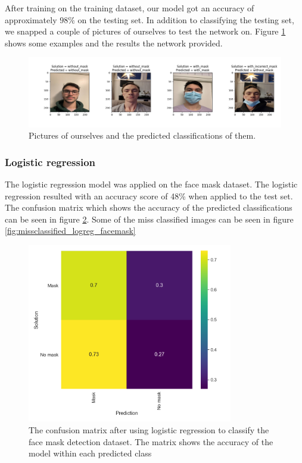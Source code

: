\documentclass[../main.tex]{subfiles}
\begin{document}
After training on the training dataset, our model got an accuracy of approximately $98\%$ on the testing set. In addition to classifying the testing set, we snapped a couple of pictures of ourselves to test the network on. Figure \ref{fig:cnn_real_pics_predictions} shows some examples and the results the network provided.

\begin{figure}[H]
    \centering
    \includegraphics[width=\textwidth]{assets/cnn_real_pics_predictions.png}
    \caption{Pictures of ourselves and the predicted classifications of them.}
    \label{fig:cnn_real_pics_predictions}
\end{figure}


\subsubsection{Logistic regression}
The logistic regression model was applied on the face mask dataset. The logistic regression resulted with an accuracy score of 48\% when applied to the test set. The confusion matrix which shows the accuracy of the predicted classifications can be seen in figure \ref{fig:logreg_facemask_cm}. Some of the miss classified images can be seen in figure \ref{fig:missclassified_logreg_facemask}

\begin{figure}[H]
    \centering
    \includegraphics[width=0.8\textwidth]{assets/logreg_mask_heatmap_accuracy48_original_testset.png}
    \caption{The confusion matrix after using logistic regression to classify the face mask detection dataset. The matrix shows the accuracy of the model within each predicted class}
    \label{fig:logreg_facemask_cm}
\end{figure}
\end{document}
